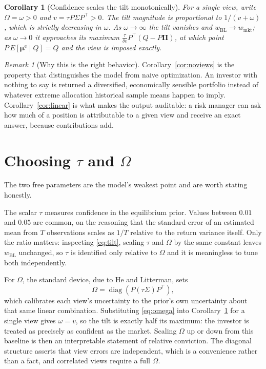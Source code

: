 \documentclass[11pt]{article}
\newtheorem{corollary}{Corollary}
\theoremstyle{remark}
\newtheorem*{remark}{Remark}
\theoremstyle{definition}
\begin{document}
\begin{corollary}[Confidence scales the tilt monotonically]
\label{cor:confidence}
For a single view, write $\Omega = \omega > 0$ and $v = \tau P\Sigma P^\top > 0$. The tilt magnitude is proportional to $1/(v + \omega)$, which is strictly decreasing in $\omega$. As $\omega \to \infty$ the tilt vanishes and $w_{\mathrm{BL}} \to w_{\mathrm{mkt}}$; as $\omega \to 0$ it approaches its maximum $\tfrac{\tau}{\delta v}P^\top(Q - P\boldsymbol\Pi)$, at which point $P\,E[\boldsymbol\mu^{\mathrm{e}}\mid Q] = Q$ and the view is imposed exactly.
\end{corollary}

\begin{remark}[Why this is the right behavior]
\label{rem:why}
Corollary~\ref{cor:noviews} is the property that distinguishes the model from naive optimization. An investor with nothing to say is returned a diversified, economically sensible portfolio instead of whatever extreme allocation historical sample means happen to imply. Corollary~\ref{cor:linear} is what makes the output auditable: a risk manager can ask how much of a position is attributable to a given view and receive an exact answer, because contributions add.
\end{remark}

\section{Choosing $\tau$ and $\Omega$}
\label{sec:params}

The two free parameters are the model's weakest point and are worth stating honestly.

The scalar $\tau$ measures confidence in the equilibrium prior. Values between $0.01$ and $0.05$ are common, on the reasoning that the standard error of an estimated mean from $T$ observations scales as $1/T$ relative to the return variance itself. Only the ratio matters: inspecting \eqref{eq:tilt}, scaling $\tau$ and $\Omega$ by the same constant leaves $w_{\mathrm{BL}}$ unchanged, so $\tau$ is identified only relative to $\Omega$ and it is meaningless to tune both independently.

For $\Omega$, the standard device, due to He and Litterman, sets
\begin{equation}
\label{eq:omega}
\Omega = \operatorname{diag}\!\left(P(\tau\Sigma)P^\top\right),
\end{equation}
which calibrates each view's uncertainty to the prior's own uncertainty about that same linear combination. Substituting \eqref{eq:omega} into Corollary~\ref{cor:confidence} for a single view gives $\omega = v$, so the tilt is exactly half its maximum: the investor is treated as precisely as confident as the market. Scaling $\Omega$ up or down from this baseline is then an interpretable statement of relative conviction. The diagonal structure asserts that view errors are independent, which is a convenience rather than a fact, and correlated views require a full $\Omega$.
\end{document}
